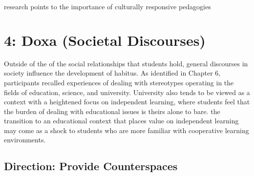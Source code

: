 research points to the importance of culturally responsive pedagogies \citep{glynn2010culturally}


\section{4: Doxa (Societal Discourses)}
Outside of the of the social relationships that students hold, general discourses in society influence the development of habitus. As identified in Chapter 6, participants recalled experiences of dealing with stereotypes operating in the fields of education, science, and university. University also tends to be viewed as a context with a heightened focus on independent learning, where students feel that the burden of dealing with educational issues is theirs alone to bare. the transition to an educational context that places value on independent learning may come as a shock to students who are more familiar with cooperative learning environments.

\subsection{Direction: Provide Counterspaces}


